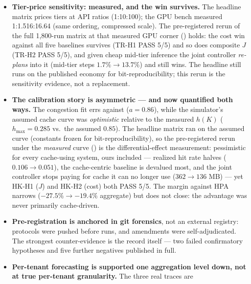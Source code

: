 \begin{itemize}
        day than the entire replay; the 10.63M-request demand replay is the
        honest analog at decision level, and no stronger claim is made.
  \item \textbf{Tier-price sensitivity: measured, and the win survives.}
        The headline matrix prices tiers at API ratios (1:10:100); the GPU
        bench measured 1:1.516:16.64 (same ordering, compressed scale). The
        pre-registered rerun of the full 1{,}800-run matrix at that measured
        GPU corner () holds:
        the cost win against all five baselines survives (TR-H1 PASS 5/5) and
        so does composite $J$ (TR-H2 PASS 5/5), and given cheap mid-tier
        inference the joint controller \emph{re-plans} into it (mid-tier steps
        $1.7\% \to 13.7\%$) and still wins. The headline still runs on the
        published economy for bit-reproducibility; this rerun is the
        sensitivity evidence, not a replacement.
  \item \textbf{The calibration story is asymmetric --- and now quantified
        both ways.} The congestion fit errs against \polyforge{}
        ($a{=}0.86$), while the simulator's assumed cache curve was
        \emph{optimistic} relative to the measured $h(K)$ ($h_{\max}{=}0.285$
        vs.\ the assumed $0.85$). The headline matrix ran on the assumed curve
        (constants frozen for bit-reproducibility), so the pre-registered
        rerun under the \emph{measured} curve
        () is the
        differential-effect measurement: pessimistic for every cache-using
        system, ours included --- realized hit rate halves ($0.106 \to
        0.051$), the cache-centric baseline is devalued most, and the joint
        controller stops paying for cache it can no longer use ($362 \to 136$
        MB) --- yet HK-H1 ($J$) and HK-H2 (cost) both PASS 5/5. The margin
        against HPA narrows ($-27.5\% \to -19.4\%$ aggregate) but does not
        close: the advantage was never primarily cache-driven.
  \item \textbf{Pre-registration is anchored in git forensics}, not an
        external registry: protocols were pushed before runs, and
        amendments were self-adjudicated. The strongest counter-evidence is
        the record itself --- two failed confirmatory hypotheses and five
        further negatives published in full.
  \item \textbf{Per-tenant forecasting is supported one aggregation level
        down, not at true per-tenant granularity.} The three real traces are

\end{itemize}
